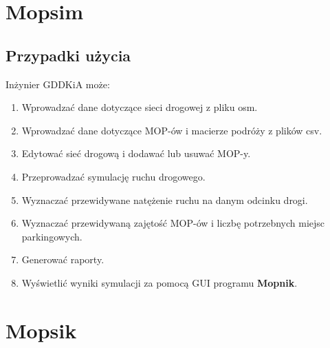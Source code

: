 \chapter{Mopsim}\label{r:mopsim}

\section{Przypadki użycia}
Inżynier GDDKiA może:
\begin{enumerate}
  \item Wprowadzać dane dotyczące sieci drogowej z pliku osm.
  \item Wprowadzać dane dotyczące MOP-ów i macierze podróży z plików csv.
  \item Edytować sieć drogową i dodawać lub usuwać MOP-y.
  \item Przeprowadzać symulację ruchu drogowego.
  \item Wyznaczać przewidywane natężenie ruchu na danym odcinku drogi.
  \item Wyznaczać przewidywaną zajętość MOP-ów i liczbę potrzebnych miejsc parkingowych.
  \item Generować raporty.
  \item Wyświetlić wyniki symulacji za pomocą GUI programu \textbf{Mopnik}.
\end{enumerate}

\chapter{Mopsik}\label{r:apka} 

